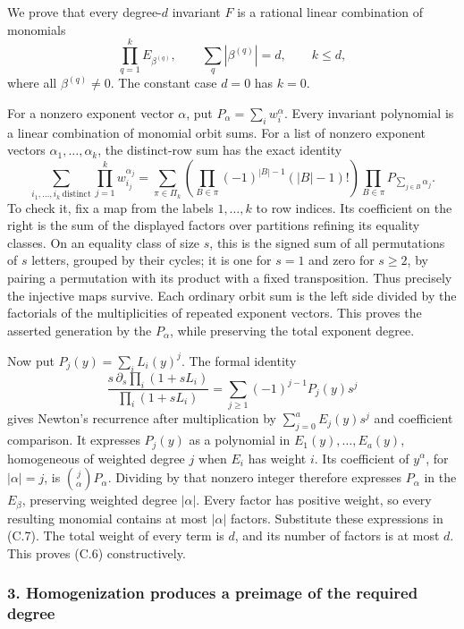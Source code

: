 \documentclass[
  10pt,
]{article}
\begin{document}
We prove that every degree-\(d\) invariant \(F\) is a rational linear
combination of monomials \[
 \prod_{q=1}^k E_{\beta^{(q)}},
 \qquad \sum_q|\beta^{(q)}|=d,
 \qquad k\le d,
\tag{C.6}
\] where all \(\beta^{(q)}\ne0\). The constant case \(d=0\) has \(k=0\).

For a nonzero exponent vector \(\alpha\), put
\(P_\alpha=\sum_iw_i^\alpha\). Every invariant polynomial is a linear
combination of monomial orbit sums. For a list of nonzero exponent
vectors \(\alpha_1,\ldots,\alpha_k\), the distinct-row sum has the exact
identity \[
 \sum_{i_1,\ldots,i_k\ \mathrm{distinct}}
 \prod_{j=1}^k w_{i_j}^{\alpha_j}
 =\sum_{\pi\in\Pi_k}
 \left(\prod_{B\in\pi}(-1)^{|B|-1}(|B|-1)!\right)
 \prod_{B\in\pi}P_{\sum_{j\in B}\alpha_j}.
\tag{C.7}
\] To check it, fix a map from the labels \(1,\ldots,k\) to row indices.
Its coefficient on the right is the sum of the displayed factors over
partitions refining its equality classes. On an equality class of size
\(s\), this is the signed sum of all permutations of \(s\) letters,
grouped by their cycles; it is one for \(s=1\) and zero for \(s\ge2\),
by pairing a permutation with its product with a fixed transposition.
Thus precisely the injective maps survive. Each ordinary orbit sum is
the left side divided by the factorials of the multiplicities of
repeated exponent vectors. This proves the asserted generation by the
\(P_\alpha\), while preserving the total exponent degree.

Now put \(P_j(y)=\sum_iL_i(y)^j\). The formal identity \[
 \frac{s\,\partial_s\prod_i(1+sL_i)}{\prod_i(1+sL_i)}
 =\sum_{j\ge1}(-1)^{j-1}P_j(y)s^j
\tag{C.8}
\] gives Newton's recurrence after multiplication by
\(\sum_{j=0}^a E_j(y)s^j\) and coefficient comparison. It expresses
\(P_j(y)\) as a polynomial in \(E_1(y),\ldots,E_a(y)\), homogeneous of
weighted degree \(j\) when \(E_i\) has weight \(i\). Its coefficient of
\(y^\alpha\), for \(|\alpha|=j\), is \(\binom{j}{\alpha}P_\alpha\).
Dividing by that nonzero integer therefore expresses \(P_\alpha\) in the
\(E_\beta\), preserving weighted degree \(|\alpha|\). Every factor has
positive weight, so every resulting monomial contains at most
\(|\alpha|\) factors. Substitute these expressions in (C.7). The total
weight of every term is \(d\), and its number of factors is at most
\(d\). This proves (C.6) constructively.

\subsubsection{3. Homogenization produces a preimage of the required
degree}\label{homogenization-produces-a-preimage-of-the-required-degree}
\end{document}
